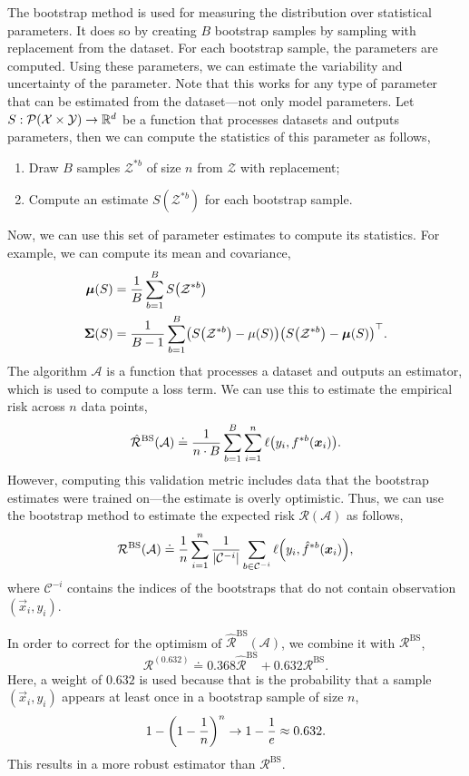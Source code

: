 The bootstrap method is used for measuring the distribution over statistical parameters. It does so
by creating $B$ bootstrap samples by sampling with replacement from the dataset. For each bootstrap
sample, the parameters are computed. Using these parameters, we can estimate the variability and
uncertainty of the parameter. Note that this works for any type of parameter that can be estimated
from the dataset---not only model parameters. Let $S: \mathcal{P}(\mathcal{X} \times \mathcal{Y})
    \to \mathbb{R}^d$ be a function that processes datasets and outputs parameters, then we can compute the
statistics of this parameter as follows,
\begin{enumerate}
    \item Draw $B$ samples $\mathcal{Z}^{*b}$ of size $n$ from $\mathcal{Z}$ with replacement;
    \item Compute an estimate $S(\mathcal{Z}^{*b})$ for each bootstrap sample.
\end{enumerate}
Now, we can use this set of parameter estimates to compute its statistics. For example, we can compute its mean and covariance,
\begin{align*}
    \vec{\mu}(S)    & = \frac{1}{B} \sum_{b=1}^{B} S\lft(\mathcal{Z}^{*b}\rgt)                                                                                             \\
    \mat{\Sigma}(S) & = \frac{1}{B-1} \sum_{b=1}^{B}  \lft( S\lft(\mathcal{Z}^{*b}\rgt) - \mu(S) \rgt) \transpose{\lft( S\lft(\mathcal{Z}^{*b}\rgt) - \vec{\mu}(S) \rgt)}.
\end{align*}
The algorithm $\mathcal{A}$ is a function that processes a dataset and outputs an estimator, which
is used to compute a loss term. We can use this to estimate the empirical risk across $n$ data
points, \[
    \hat{\mathcal{R}}^{\mathrm{BS}}(\mathcal{A}) \doteq \frac{1}{n \cdot B} \sum_{b=1}^{B} \sum_{i=1}^{n} \ell\lft(y_i, f^{*b}\lft(\vec{x}_i\rgt)\rgt).
\]
However, computing this validation metric includes data that the bootstrap estimates were trained
on---the estimate is overly optimistic. Thus, we can use the bootstrap method to estimate the
expected risk $\mathcal{R}(\mathcal{A})$ as follows, \[
    \mathcal{R}^{\mathrm{BS}}(\mathcal{A}) \doteq \frac{1}{n} \sum_{i=1}^{n} \frac{1}{|\mathcal{C}^{-i}|} \sum_{b \in \mathcal{C}^{-i}} \ell\lft(y_i, \hat{f}^{*b}\lft(\vec{x}_i\rgt)\rgt),
\]
where $\mathcal{C}^{-i}$ contains the indices of the bootstraps that do not contain observation
$(\vec{x}_i, y_i)$.

In order to correct for the optimism of $\hat{\mathcal{R}}^{\mathrm{BS}}(\mathcal{A})$, we combine
it with $\mathcal{R}^{\mathrm{BS}}$, \[
    \mathcal{R}^{(0.632)} \doteq 0.368 \hat{\mathcal{R}}^{\mathrm{BS}} + 0.632 \mathcal{R}^{\mathrm{BS}}.
\]
Here, a weight of $0.632$ is used because that is the probability that a sample $(\vec{x}_i, y_i)$
appears at least once in a bootstrap sample of size $n$, \[
    1 - \lft( 1 - \frac{1}{n} \rgt)^n \to 1 - \frac{1}{e} \approx 0.632.
\]
This results in a more robust estimator than $\mathcal{R}^{\mathrm{BS}}$.

